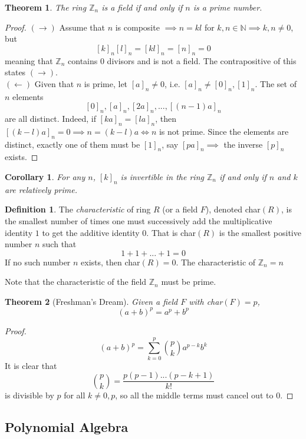 \documentclass{article}
\newtheorem{theorem}{Theorem}[section]
\newtheorem{corollary}{Corollary}[theorem]
\theoremstyle{remark}
\theoremstyle{definition}
\newtheorem{definition}{Definition}[section]
\begin{document}
\begin{theorem}
The ring $\mathbb{Z}_{n}$ is a field if and only if $n$ is a prime number. 
\end{theorem}
\begin{proof}
$(\rightarrow)$ Assume that $n$ is composite $\implies n = k l$ for $k, n \in \mathbb{N} \implies k, n \neq 0$, but 
\[ [k]_n [l]_n = [k l]_n = [n]_n = 0\]
meaning that $\mathbb{Z}_n$ contains $0$ divisors and is not a field. The contrapositive of this states $(\rightarrow)$. \\
$(\leftarrow)$ Given that $n$ is prime, let $[a]_n \neq 0$, i.e. $[a]_n \neq [0]_n, [1]_n$. The set of $n$ elements 
\[[0]_n, [a]_n, [2a]_n, ..., [(n-1)a]_n\]
are all distinct. Indeed, if $[k a]_n = [l a]_n$, then $[(k-l) a]_n = 0 \implies n = (k-l) a \iff n$ is not prime. Since the elements are distinct, exactly one of them must be $[1]_n$, say $[p a]_n \implies$ the inverse $[p]_n$ exists. 
\end{proof}

\begin{corollary}
For any $n$, $[k]_n$ is invertible in the ring $\mathbb{Z}_n$ if and only if $n$ and $k$ are relatively prime. 
\end{corollary}

\begin{definition}
The \textit{characteristic} of ring $R$ (or a field $F$), denoted char$(R)$, is the smallest number of times one must successively add the multiplicative identity $1$ to get the additive identity $0$. That is char$(R)$ is the smallest positive number $n$ such that 
\[ 1 + 1 + ... + 1 = 0 \]
If no such number $n$ exists, then char$(R) = 0$. The characteristic of $\mathbb{Z}_n = n$
\end{definition}

Note that the characteristic of the field $\mathbb{Z}_n$ must be prime. 

\begin{theorem}[Freshman's Dream]
Given a field $F$ with char$(F) = p$, 
\[(a + b)^p = a^p + b^p\]
\end{theorem}
\begin{proof}
  \[(a + b)^p = \sum_{k = 0}^p \binom{p}{k} a^{p-k} b^{k}\]
It is clear that 
\[\binom{p}{k} = \frac{p (p-1) ... (p - k+1)}{k!}\]
is divisible by $p$ for all $k \neq 0, p$, so all the middle terms must cancel out to $0$. 
\end{proof}

\subsection{Polynomial Algebra}
\end{document}
